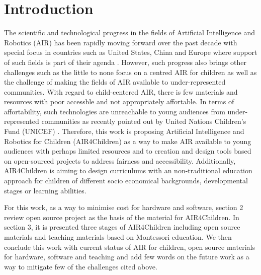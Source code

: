 \documentclass[sigconf]{acmart}
\begin{document}
\maketitle

\section{Introduction} 
The scientific and technological progress in the fields of Artificial Intelligence and Robotics (AIR) has been rapidly moving forward over the past decade with special focus in countries such as United States, China and Europe where support of such fields is part of their agenda \cite{Savage2020}. 
However, such progress also brings other challenges such as the little to none focus on a centred AIR for children as well as the challenge of making the fields of AIR available to under-represented communities.
With regard to child-centered AIR, there is few materials and resources with poor accessble and not appropriately affortable.  
In terms of affortability, such technologies are unreachable to young audiences from under-represented communities as recently pointed out by United Nations Children's Fund (UNICEF) \cite{UNICEF2020}.
Therefore, this work is proposing Artificial Intelligence and Robotics for Children (AIR4Children) as a way to make AIR available to young audiences with perhaps limited resources and to creation and design tools based on open-sourced projects to address fairness and accessibility. 
Additionally, AIR4Children is aiming to design curriculums with an non-traditional education approach for children of different socio economical backgrounds, developmental stages or learning abilities. 

For this work, as a way to minimise cost for hardware and software, section 2 review open source project as the basis of the material for AIR4Children.
In section 3, it is presented three stages of AIR4Children including open source materials and teaching materials based on Montessori education. 
We then conclude this work with current status of AIR for children, open source materials for hardware, software and teaching and add few words on the future work as a way to mitigate few of the challenges cited above. 
\end{document}
